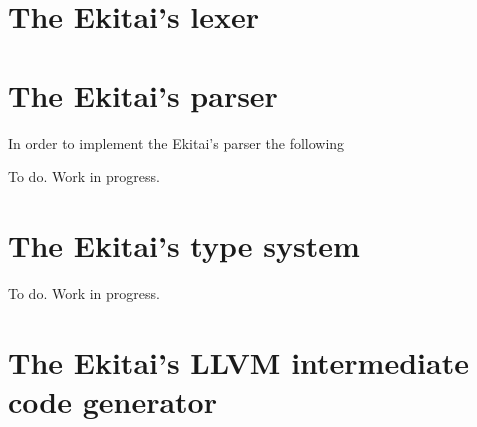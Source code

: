 \documentclass[
  oneside,
  english,
  coorientadorbanca,
  noabntexcite
]{ufsc-thesis-rn46-2019}
\def\bnfdef{::=}
\newcommand{\codett}[1]{\text{\scpfamily#1}}
\newcommand{\code}[1]{\text{\scpfamily\setlength\spaceskip{0.35em}#1}}
\newcommand{\bnfvar}[1]{\codett{#1}}
\newcommand{\bnfor}[1]{{$\mid$} #1}
\newcommand{\bnfprod}[2]{\bnfvar{#1} & \ & \bnfdef{} & \ \code{#2}}
\newcommand{\bnfmore}[1]{            & \ & \mid{}    & \ \code{#1}}
\begin{document}
\section{The Ekitai's lexer}

\section{The Ekitai's parser}

In order to implement the Ekitai's parser the following

To do. Work in progress.

\section{The Ekitai's type system}

To do. Work in progress.

\section{The Ekitai's LLVM intermediate code generator}
\end{document}
